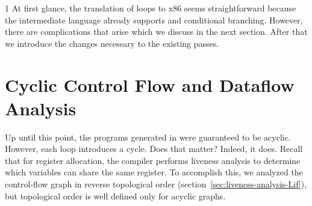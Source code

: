 \documentclass[7x10]{TimesAPriori_MIT}%
\def\pythonEd{1}
\def\edition{0}
\numberwithin{theorem}{chapter}
\numberwithin{definition}{chapter}
\numberwithin{equation}{chapter}
\begin{document}
{\if\edition\pythonEd
%
At first glance, the translation of  loops to x86 seems
straightforward because the \LangCIf{} intermediate language already
supports  and conditional branching. However, there are
complications that arise which we discuss in the next section. After
that we introduce the changes necessary to the existing passes.
%
\fi}

\section{Cyclic Control Flow and Dataflow Analysis}
\label{sec:dataflow-analysis}

Up until this point, the programs generated in
 were guaranteed to be acyclic. However, each
 loop introduces a cycle. Does that matter?
%
Indeed, it does.  Recall that for register allocation, the compiler
performs liveness analysis to determine which variables can share the
same register.  To accomplish this, we analyzed the control-flow graph
in reverse topological order
(section~\ref{sec:liveness-analysis-Lif}), but topological order is
well defined only for acyclic graphs.
\end{document}
